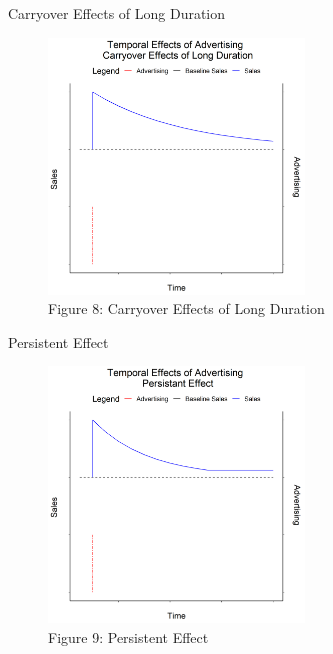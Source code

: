 \documentclass[pdf]{beamer}
\theoremstyle{remark}
\theoremstyle{definition}
\begin{document}
\begin{frame}[t]{Carryover Effects of Long Duration}
\begin{figure}[htbp]
  \captionsetup{justification=centering}
  \includegraphics[height=6.8cm, trim=0.3cm 0.3cm 0.3cm 0.3cm width=6.8cm]{../BUSA_603_Ad_Response/Output/m5_3.png}
  \caption{Figure {\color{franklinblue} 8}: Carryover Effects of Long Duration}
\end{figure}
\end{frame}

\begin{frame}[t]{Persistent Effect}
\begin{figure}[htbp]
  \captionsetup{justification=centering}
  \includegraphics[height=6.8cm, trim=0.3cm 0.3cm 0.3cm 0.3cm width=6.8cm]{../BUSA_603_Ad_Response/Output/m5_4.png}
  \caption{Figure {\color{franklinblue} 9}: Persistent Effect}
\end{figure}
\end{frame}
\end{document}
